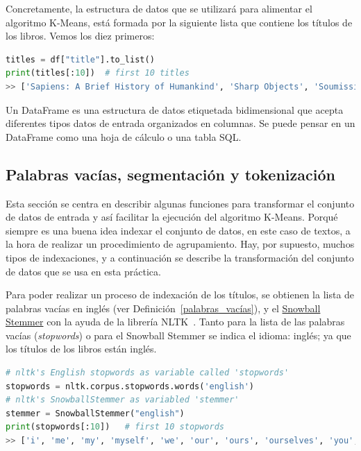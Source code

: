 \documentclass{uimppracticas}
\begin{document}
Concretamente, la estructura de datos que se utilizará para alimentar el algoritmo K-Means, está formada por la siguiente lista que contiene los títulos de los libros. Vemos los diez primeros:

\begin{lstlisting}[language=python, basicstyle=\small]
titles = df["title"].to_list()
print(titles[:10])  # first 10 titles
>> ['Sapiens: A Brief History of Humankind', 'Sharp Objects', 'Soumission', 'Tipping the Velvet', 'A Light in the Attic', "It's Only the Himalayas", 'Libertarianism for Beginners', 'Mesaerion: The Best Science Fiction Stories 1800-1849', 'Olio', 'Our Band Could Be Your Life: Scenes from the American Indie Underground, 1981-1991']
\end{lstlisting}

\begin{definition}\label{dataframe}
	Un DataFrame es una estructura de datos etiquetada bidimensional que acepta diferentes tipos datos de entrada organizados en columnas. Se puede pensar en un DataFrame como una hoja de cálculo o una tabla SQL.
\end{definition}

\subsection{Palabras vacías, segmentación y tokenización}\label{stem_token}

Esta sección se centra en describir algunas funciones para transformar el conjunto de datos de entrada y así facilitar la ejecución del algoritmo K-Means. Porqué siempre es una buena idea indexar el conjunto de datos, en este caso de textos, a la hora de realizar un procedimiento de agrupamiento. Hay, por supuesto, muchos tipos de indexaciones, y a continuación se describe la transformación del conjunto de datos que se usa en esta práctica.

Para poder realizar un proceso de indexación de los títulos, se obtienen la lista de palabras vacías en inglés (ver Definición~\ref{palabras_vacías}), y el \href{https://www.nltk.org/_modules/nltk/stem/snowball.html}{Snowball Stemmer} con la ayuda de la librería NLTK~\cite{bird2009natural}. Tanto para la lista de las palabras vacías (\textit{stopwords}) o para el Snowball Stemmer se indica el idioma: inglés; ya que los títulos de los libros están inglés. 

\begin{lstlisting}[language=python, basicstyle=\small]
# nltk's English stopwords as variable called 'stopwords'	
stopwords = nltk.corpus.stopwords.words('english')  
# nltk's SnowballStemmer as variabled 'stemmer'
stemmer = SnowballStemmer("english")
print(stopwords[:10])   # first 10 stopwords
>> ['i', 'me', 'my', 'myself', 'we', 'our', 'ours', 'ourselves', 'you', "you're"]    
\end{lstlisting}
\end{document}
